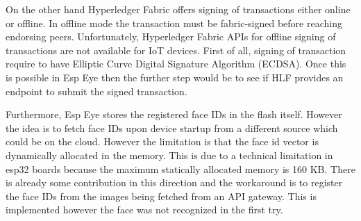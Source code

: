 On the other hand Hyperledger Fabric offers signing of transactions either online or offline. In offline mode the transaction must be fabric-signed before reaching endorsing peers. Unfortunately, Hyperledger Fabric APIs for offline signing of transactions are not available for IoT devices. First of all, signing of transaction require to have Elliptic Curve Digital Signature Algorithm (ECDSA). Once this is possible in Esp Eye then the further step would be to see if HLF provides an endpoint to submit the signed transaction. 

Furthermore, Esp Eye stores the registered face IDs in the flash itself. However the idea is to fetch face IDs upon device startup from a different source which could be on the cloud. However the limitation is that the face id vector is dynamically allocated in the memory. This is due to a technical limitation in esp32 boards because the maximum statically allocated memory is 160 KB. 
There is already some contribution in this direction and the workaround is to register the face IDs from the images being fetched from an API gateway. This is implemented however the face was not recognized in the first try. 
